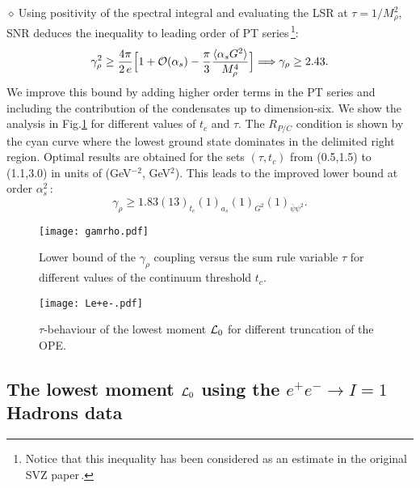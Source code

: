 \documentclass[aps,prd,groupedaddress,nofootinbib]{revtex4-1}
\def\beq{\begin{equation}}
\def\eeq{\end{equation}}
\def\lrar{\Longrightarrow}
\def\la{\langle}
\def\ra{\rangle}
\def\d{$\diamond~$}
\begin{document}
\d Using positivity of the spectral integral and evaluating the LSR at $\tau=1/M_{\rho}^2$,  SNR deduces the inequality to leading order of PT series\,\footnote{Notice that this inequality has been considered as an estimate in the original SVZ paper\,\cite{SVZa}.}:
\beq
\gamma_\rho^2\geq \frac{4\pi}{2\,e}\Big{[}1+{\cal O}(\alpha_s)-\frac{\pi}{3}\frac{\la \alpha_s G^2\ra}{M_\rho^4}\Big{]}\lrar \gamma_\rho\geq  2.43.
\eeq
We improve this bound by adding higher order terms in the PT series and including the contribution of the condensates up to dimension-six.  We show the analysis in Fig.\ref{fig:gamrho} for different values of $t_c$ and $\tau$.  The $R_{P/C}$ condition is shown by the cyan curve where the lowest ground state dominates in the delimited right region.  Optimal results are obtained for the sets $(\tau,t_c)$  from (0.5,1.5) to (1.1,3.0) in units of (GeV$^{-2}$, GeV$^2$). This leads to the improved lower bound at order $\alpha_s^2$\,:
\beq
\gamma_\rho \geq 1.83(13)_{t_c}(1)_{a_s}(1)_{G^2}(1)_{\bar\psi\psi^2}.
\eeq
\vspace*{-1cm}
\begin{figure}[hbt]
\begin{center}
\texttt{[image: gamrho.pdf]}
\caption{\normalsize  Lower bound  of the $\gamma_\rho$ coupling  versus the sum rule variable $\tau$ for different values of the continuum threshold $t_c$.} \label{fig:gamrho}
\end{center}
\vspace*{-0.5cm}
\end{figure} 
\vspace*{-0.5cm}
\begin{figure}[hbt]
\begin{center}
\texttt{[image: Le+e-.pdf]}
\caption{\normalsize  $\tau$-behaviour of the lowest moment ${\cal L}_0$ for different truncation of the OPE.}\label{fig:Lee}
\end{center}
\vspace*{-0.5cm}
\end{figure} 
\subsection{The lowest moment ${\cal L}_0$ using the $e^+e^-\to I=1$ Hadrons data}
\end{document}
